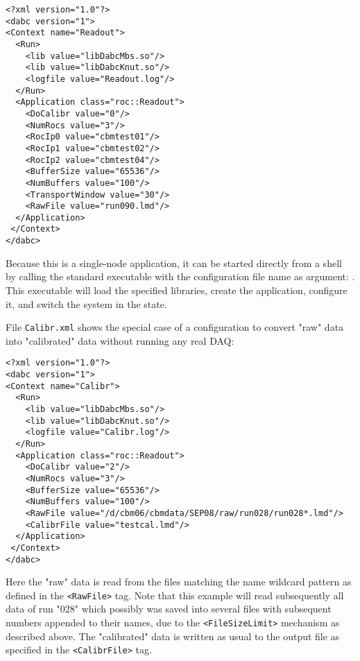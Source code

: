 \begin{verbatim}
<?xml version="1.0"?>
<dabc version="1">
<Context name="Readout">
  <Run>
    <lib value="libDabcMbs.so"/>
    <lib value="libDabcKnut.so"/>
    <logfile value="Readout.log"/>
  </Run>
  <Application class="roc::Readout">
    <DoCalibr value="0"/>
    <NumRocs value="3"/>
    <RocIp0 value="cbmtest01"/>
    <RocIp1 value="cbmtest02"/>
    <RocIp2 value="cbmtest04"/>
    <BufferSize value="65536"/>
    <NumBuffers value="100"/>
    <TransportWindow value="30"/>
    <RawFile value="run090.lmd"/>
  </Application>
 </Context>
</dabc>
\end{verbatim}

Because this is a single-node application, 
it can be started directly from a shell 
by calling the standard 
executable with the configuration file name as argument:
. 
This executable will load the specified libraries,
create the application, configure it, and switch the system in 
the  state.   

File  {\tt Calibr.xml} shows the special case of a configuration to convert 
"raw" data into "calibrated" data without running any real DAQ:


\begin{verbatim}
<?xml version="1.0"?>
<dabc version="1">
<Context name="Calibr">
  <Run>
    <lib value="libDabcMbs.so"/>
    <lib value="libDabcKnut.so"/>
    <logfile value="Calibr.log"/>
  </Run>
  <Application class="roc::Readout">
    <DoCalibr value="2"/>
    <NumRocs value="3"/>
    <BufferSize value="65536"/>
    <NumBuffers value="100"/>
    <RawFile value="/d/cbm06/cbmdata/SEP08/raw/run028/run028*.lmd"/>
    <CalibrFile value="testcal.lmd"/>
  </Application>
 </Context>
</dabc>
\end{verbatim}

Here the "raw" data is read from the files matching the name wildcard pattern 
as defined in the {\tt <RawFile>} tag. Note that this example will 
read subsequently all data of run "028" which possibly was saved
into several files with subsequent numbers appended to their names, due to the 
{\tt <FileSizeLimit>} mechanism as described above.
The "calibrated" data is written as usual to the output file
as specified in the {\tt <CalibrFile>} tag.

 